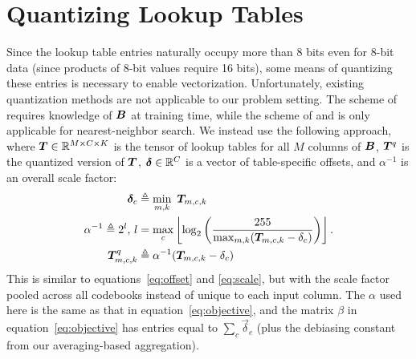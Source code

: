
\section{Quantizing Lookup Tables} \label{sec:lutQuantize}


Since the lookup table entries naturally occupy more than 8 bits even for 8-bit data (since products of 8-bit values require 16 bits), some means of quantizing these entries is necessary to enable vectorization. Unfortunately, existing quantization methods are not applicable to our problem setting. The scheme of \citet{bolt} requires knowledge of $\bm{B}$ at training time, while the scheme of \citet{quickAdc} and \citet{quickerAdc} is only applicable for nearest-neighbor search. We instead use the following approach, where $\bm{T} \in \mathbb{R}^{M \times C \times K}$ is the tensor of lookup tables for all $M$ columns of $\bm{B}$, $\bm{T}^{q}$ is the quantized version of $\bm{T}$, $\bm{\delta} \in \mathbb{R}^C$ is a vector of table-specific offsets, and $\alpha^{-1}$ is an overall scale factor:
\begin{align}
    \bm{\delta}_c &\triangleq \min_{m,k} \text{ } \bm{T}_{m,c,k} \\
    \alpha^{-1} \triangleq 2^l \text{, } l &= \max_c \left \lfloor  \log_2 \left( \frac{255}{
            \max_{m,k} (\bm{T}_{m,c,k} - \delta_{c})
        } \right) \right \rfloor. \\
    \bm{T}^{q}_{m,c,k} &\triangleq \alpha^{-1}(\bm{T}_{m,c,k} - \delta_{c})
\end{align}
This is similar to equations~\ref{eq:offset} and \ref{eq:scale}, but with the scale factor pooled across all codebooks instead of unique to each input column. The $\alpha$ used here is the same as that in equation~\ref{eq:objective}, and the matrix $\beta$ in equation~\ref{eq:objective} has entries equal to $\sum_c \vec{\delta}_c$ (plus the debiasing constant from our averaging-based aggregation).

